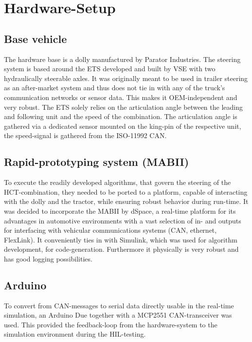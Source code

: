 \documentclass[root.tex]{subfiles}
\begin{document}
{\pagestyle{empty}}
\section{Hardware-Setup}
\label{chap:Hardware-Setup}
\subsection{Base vehicle}

The hardware base is a dolly manufactured by Parator Industries. The steering system is based around the \gls{ETS} developed and built by \gls{VSE} with two hydraulically steerable axles. It was originally meant to be used in trailer steering as an after-market system and thus does not tie in with any of the truck's communication networks or sensor data. This makes it OEM-independent and very robust. The \gls{ETS} solely relies on the articulation angle between the leading and following unit and the speed of the combination. The articulation angle is gathered via a dedicated sensor mounted on the king-pin of the respective unit, the speed-signal is gathered from the ISO-11992 \gls{CAN}. 

\subsection{Rapid-prototyping system (\gls{MABII})}

To execute the readily developed algorithms\cite{c27}, that govern the steering of the \gls{HCT}-combination, they needed to be ported to a platform, capable of interacting with the dolly and the tractor, while ensuring robust behavior during run-time. It was decided to incorporate the \gls{MABII} by dSpace, a real-time platform for its advantages in automotive environments with a vast selection of in- and outputs for interfacing with vehicular communications systems (\gls{CAN}, ethernet, FlexLink). It conveniently ties in with Simulink, which was used for algorithm development, for code-generation. Furthermore it physically is very robust and has good logging possibilities.


\subsection{Arduino}

To convert from \gls{CAN}-messages to serial data directly usable in the real-time simulation, an Arduino Due together with a MCP2551 \gls{CAN}-transceiver was used. This provided the feedback-loop from the hardware-system to the simulation environment during the \gls{HIL}-testing. 
\end{document}
